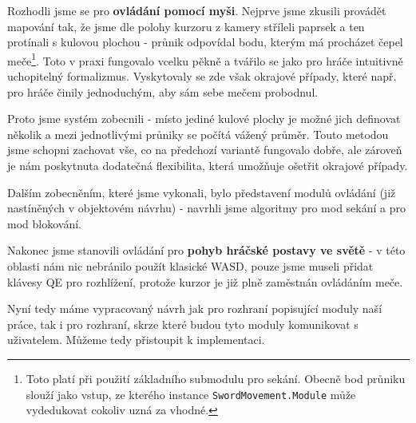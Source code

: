 Rozhodli jsme se pro \textbf{ovládání pomocí myši}. Nejprve jsme zkusili provádět mapování tak, že jsme dle polohy kurzoru z kamery stříleli paprsek a ten protínali s kulovou plochou - průnik odpovídal bodu, kterým má procházet čepel meče\footnote{Toto platí při použití základního submodulu pro sekání. Obecně bod průniku slouží jako vstup, ze kterého instance \texttt{SwordMovement.Module} může vydedukovat cokoliv uzná za vhodné.}. Toto v praxi fungovalo vcelku pěkně a tvářilo se jako pro hráče intuitivně uchopitelný formalizmus. Vyskytovaly se zde však okrajové případy, které např. pro hráče činily jednoduchým, aby sám sebe mečem probodnul.

Proto jsme systém zobecnili - místo jediné kulové plochy je možné jich definovat několik a mezi jednotlivými průniky se počítá vážený průměr. Touto metodou jsme schopni zachovat vše, co na předchozí variantě fungovalo dobře, ale zároveň je nám poskytnuta dodatečná flexibilita, která umožňuje ošetřit okrajové případy.

Dalším zobecněním, které jsme vykonali, bylo představení modulů ovládání (již nastíněných v objektovém návrhu) - navrhli jsme algoritmy pro mod sekání a pro mod blokování.

Nakonec jsme stanovili ovládání pro \textbf{pohyb hráčské postavy ve světě} - v této oblasti nám nic nebránilo použít klasické WASD, pouze jsme museli přidat klávesy QE pro rozhlížení, protože kurzor je již plně zaměstnán ovládáním meče.

\bigbreak
Nyní tedy máme vypracovaný návrh jak pro rozhraní popisující moduly naší práce, tak i pro rozhraní, skrze které budou tyto moduly komunikovat s uživatelem. Můžeme tedy přistoupit k implementaci.
